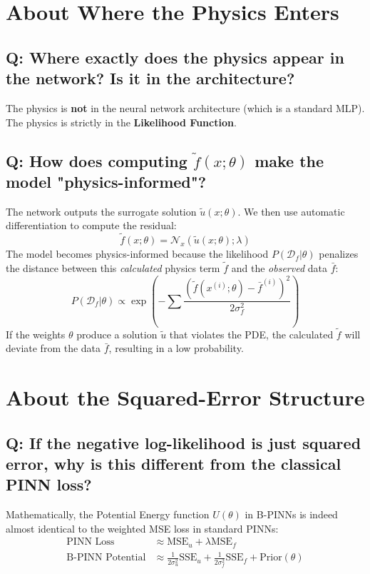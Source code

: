 \documentclass[11pt, a4paper]{article}
\begin{document}
\section{About Where the Physics Enters}

\subsection*{Q: Where exactly does the physics appear in the network? Is it in the architecture?}
The physics is \textbf{not} in the neural network architecture (which is a standard MLP). The physics is strictly in the \textbf{Likelihood Function}.

\subsection*{Q: How does computing $\tilde{f}(x;\theta)$ make the model "physics-informed"?}
The network outputs the surrogate solution $\tilde{u}(x; \theta)$. We then use automatic differentiation to compute the residual:
\[
\tilde{f}(x; \theta) = \mathcal{N}_x(\tilde{u}(x; \theta); \lambda)
\]
The model becomes physics-informed because the likelihood $P(\mathcal{D}_f|\theta)$ penalizes the distance between this \textit{calculated} physics term $\tilde{f}$ and the \textit{observed} data $\bar{f}$:
\[
P(\mathcal{D}_f|\theta) \propto \exp\left(-\sum \frac{(\tilde{f}(x^{(i)};\theta) - \bar{f}^{(i)})^2}{2\sigma_f^2}\right)
\]
If the weights $\theta$ produce a solution $\tilde{u}$ that violates the PDE, the calculated $\tilde{f}$ will deviate from the data $\bar{f}$, resulting in a low probability.

\section{About the Squared-Error Structure}

\subsection*{Q: If the negative log-likelihood is just squared error, why is this different from the classical PINN loss?}
Mathematically, the Potential Energy function $U(\theta)$ in B-PINNs is indeed almost identical to the weighted MSE loss in standard PINNs:
\begin{align*}
    \text{PINN Loss} &\approx \text{MSE}_u + \lambda \text{MSE}_f \\
    \text{B-PINN Potential} &\approx \frac{1}{2\sigma_u^2}\text{SSE}_u + \frac{1}{2\sigma_f^2}\text{SSE}_f + \text{Prior}(\theta)
\end{align*}
\end{document}
